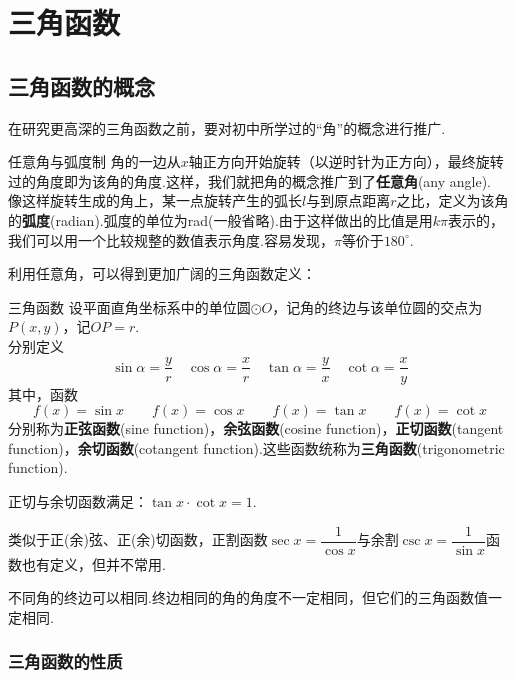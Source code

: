 \documentclass[lang=cn, zihao=5]{elegantbook}
\begin{document}
\chapter{三角函数}

\section{三角函数的概念}

在研究更高深的三角函数之前，要对初中所学过的“角”的概念进行推广.

\begin{definition}{任意角与弧度制} %
    角的一边从$x$轴正方向开始旋转（以逆时针为正方向），最终旋转过的角度即为该角的角度.这样，我们就把角的概念推广到了\textbf{任意角}(any angle).\\
    像这样旋转生成的角上，某一点旋转产生的弧长$l$与到原点距离$r$之比，定义为该角的\textbf{弧度}(radian).弧度的单位为rad(一般省略).由于这样做出的比值是用$k \pi$表示的，我们可以用一个比较规整的数值表示角度.容易发现，$\pi$等价于$180^{\circ}$.
\end{definition}

利用任意角，可以得到更加广阔的三角函数定义：

\begin{definition}{三角函数} %
    设平面直角坐标系中的单位圆$\odot O$，记角的终边与该单位圆的交点为$P(x,y)$，记$OP=r$.\\
    分别定义$$\sin{\alpha}=\frac{y}{r} \quad \cos{\alpha}=\frac{x}{r} \quad \tan{\alpha}=\frac{y}{x} \quad \cot{\alpha}=\frac{x}{y}$$
    其中，函数$$f(x)=\sin{x} \qquad f(x)=\cos{x} \qquad f(x)=\tan{x} \qquad f(x)=\cot{x}$$
    分别称为\textbf{正弦函数}(sine function)，\textbf{余弦函数}(cosine function)，\textbf{正切函数}(tangent function)，\textbf{余切函数}(cotangent function).这些函数统称为\textbf{三角函数}(trigonometric function).
\end{definition}
\begin{remark}
    正切与余切函数满足：$\tan{x} \cdot \cot{x} = 1$.
\end{remark}
\begin{remark}
    类似于正(余)弦、正(余)切函数，正割函数$\sec{x}=\dfrac{1}{\cos{x}}$与余割$\csc{x}=\dfrac{1}{\sin{x}}$函数也有定义，但并不常用.
\end{remark}
\begin{remark}
    不同角的终边可以相同.终边相同的角的角度不一定相同，但它们的三角函数值一定相同.
\end{remark}


\subsection{三角函数的性质}
\end{document}
